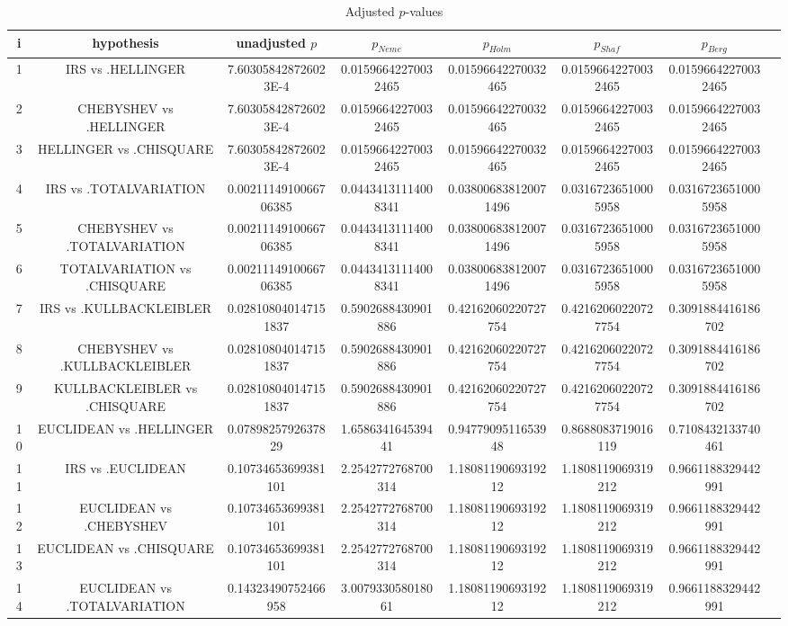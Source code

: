\documentclass[a4paper,10pt]{article}
\begin{document}
\begin{landscape}
\begin{table}[!htp]
\centering\tiny
\caption{Adjusted $p$-values}
\begin{tabular}{cccccccc}
i&hypothesis&unadjusted $p$&$p_{Neme}$&$p_{Holm}$&$p_{Shaf}$&$p_{Berg}$\\
\hline
1&IRS vs .HELLINGER&7.603058428726023E-4&0.01596642270032465&0.01596642270032465&0.01596642270032465&0.01596642270032465\\
2&CHEBYSHEV vs .HELLINGER&7.603058428726023E-4&0.01596642270032465&0.01596642270032465&0.01596642270032465&0.01596642270032465\\
3&HELLINGER vs .CHISQUARE&7.603058428726023E-4&0.01596642270032465&0.01596642270032465&0.01596642270032465&0.01596642270032465\\
4&IRS vs .TOTALVARIATION&0.0021114910066706385&0.04434131114008341&0.038006838120071496&0.03167236510005958&0.03167236510005958\\
5&CHEBYSHEV vs .TOTALVARIATION&0.0021114910066706385&0.04434131114008341&0.038006838120071496&0.03167236510005958&0.03167236510005958\\
6&TOTALVARIATION vs .CHISQUARE&0.0021114910066706385&0.04434131114008341&0.038006838120071496&0.03167236510005958&0.03167236510005958\\
7&IRS vs .KULLBACKLEIBLER&0.028108040147151837&0.5902688430901886&0.42162060220727754&0.42162060220727754&0.3091884416186702\\
8&CHEBYSHEV vs .KULLBACKLEIBLER&0.028108040147151837&0.5902688430901886&0.42162060220727754&0.42162060220727754&0.3091884416186702\\
9&KULLBACKLEIBLER vs .CHISQUARE&0.028108040147151837&0.5902688430901886&0.42162060220727754&0.42162060220727754&0.3091884416186702\\
10&EUCLIDEAN vs .HELLINGER&0.0789825792637829&1.658634164539441&0.9477909511653948&0.8688083719016119&0.7108432133740461\\
11&IRS vs .EUCLIDEAN&0.10734653699381101&2.2542772768700314&1.1808119069319212&1.1808119069319212&0.9661188329442991\\
12&EUCLIDEAN vs .CHEBYSHEV&0.10734653699381101&2.2542772768700314&1.1808119069319212&1.1808119069319212&0.9661188329442991\\
13&EUCLIDEAN vs .CHISQUARE&0.10734653699381101&2.2542772768700314&1.1808119069319212&1.1808119069319212&0.9661188329442991\\
14&EUCLIDEAN vs .TOTALVARIATION&0.14323490752466958&3.007933058018061&1.1808119069319212&1.1808119069319212&0.9661188329442991\\

\end{tabular}
\end{table}
\end{landscape}
\end{document}

